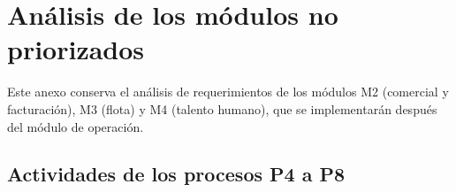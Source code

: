 
\section{Análisis de los módulos no priorizados}
\label{anx:analisis}

Este anexo conserva el análisis de requerimientos de los módulos M2
(comercial y facturación), M3 (flota) y M4 (talento humano), que se
implementarán después del módulo de operación.

\subsection{Actividades de los procesos P4 a P8}

